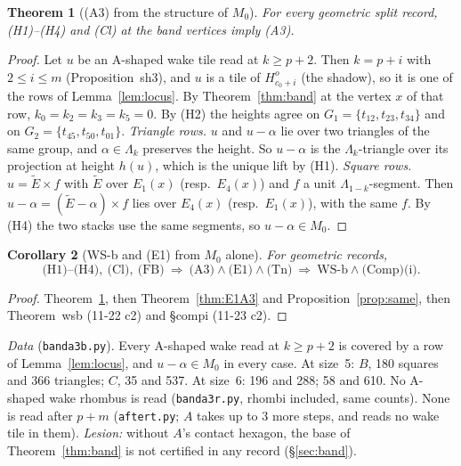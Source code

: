 \documentclass[11pt]{article}
\newtheorem{theorem}{Theorem}\newtheorem{lemma}[theorem]{Lemma}\newtheorem{proposition}[theorem]{Proposition}
\newtheorem{corollary}[theorem]{Corollary}
\theoremstyle{definition}\newtheorem{definition}[theorem]{Definition}\newtheorem{remark}[theorem]{Remark}
\begin{document}
\begin{theorem}[(A3) from the structure of $M_0$]\label{thm:A3}
For every geometric split record, (H1)--(H4) and (Cl) at the band vertices imply (A3).
\end{theorem}
\begin{proof}
Let $u$ be an A-shaped wake tile read at $k\ge p+2$. Then $k=p+i$ with $2\le i\le m$ (Proposition~sh3), and $u$ is a tile of $H^o_{c_0+i}$ (the shadow), so it is one of the rows of Lemma~\ref{lem:locus}. By Theorem~\ref{thm:band} at the vertex $x$ of that row, $k_0=k_2=k_3=k_5=0$. By (H2) the heights agree on $G_1=\{t_{12},t_{23},t_{34}\}$ and on $G_2=\{t_{45},t_{50},t_{01}\}$.
\emph{Triangle rows.} $u$ and $u-\alpha$ lie over two triangles of the same group, and $\alpha\in\Lambda_k$ preserves the height. So $u-\alpha$ is the $\Lambda_k$-triangle over its projection at height $h(u)$, which is the unique lift by (H1).
\emph{Square rows.} $u=\tilde E\times f$ with $\tilde E$ over $E_1(x)$ (resp.\ $E_4(x)$) and $f$ a unit $\Lambda_{1-k}$-segment. Then $u-\alpha=(\tilde E-\alpha)\times f$ lies over $E_4(x)$ (resp.\ $E_1(x)$), with the same $f$. By (H4) the two stacks use the same segments, so $u-\alpha\in M_0$.
\end{proof}

\begin{corollary}[WS-b and (E1) from $M_0$ alone]\label{cor:final}
For geometric records,
\[\text{(H1)--(H4)},\ \text{(Cl)},\ \text{(FB)}\ \Longrightarrow\ \text{(A3)}\wedge\text{(E1)}\wedge\text{(Tn)}\ \Longrightarrow\ \text{WS-b}\wedge\text{(Comp)(i)}.\]
\end{corollary}
\begin{proof}
Theorem~\ref{thm:A3}, then Theorem~\ref{thm:E1A3} and Proposition~\ref{prop:same}, then Theorem~wsb (11-22 c2) and \S compi (11-23 c2).
\end{proof}
\noindent\emph{Data} (\texttt{banda3b.py}). Every A-shaped wake read at $k\ge p+2$ is covered by a row of Lemma~\ref{lem:locus}, and $u-\alpha\in M_0$ in every case. At size~5: $B$, 180 squares and 366 triangles; $C$, 35 and 537. At size~6: 196 and 288; 58 and 610. No A-shaped wake rhombus is read (\texttt{banda3r.py}, rhombi included, same counts). None is read after $p+m$ (\texttt{aftert.py}; $A$ takes up to 3 more steps, and reads no wake tile in them). \emph{Lesion:} without $A$'s contact hexagon, the base of Theorem~\ref{thm:band} is not certified in any record (\S\ref{sec:band}).
\end{document}
